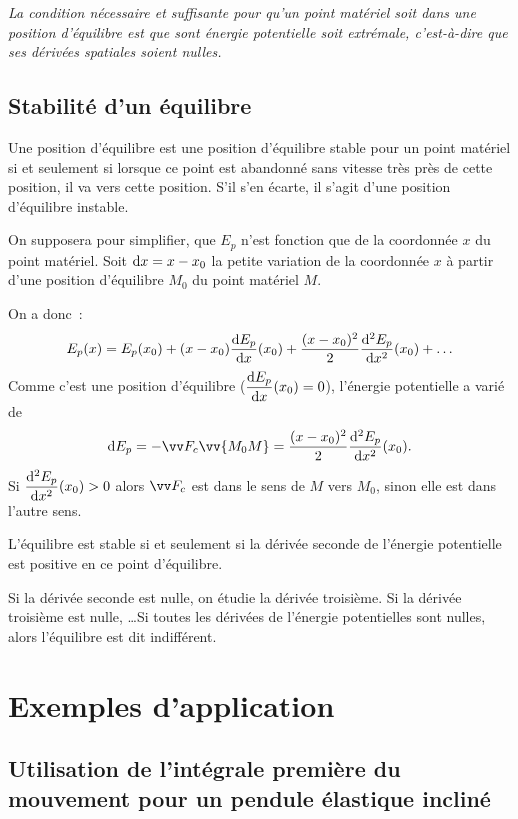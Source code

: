 \emph{La condition nécessaire et suffisante pour qu'un point matériel soit dans une position d'équilibre est que sont énergie potentielle soit extrémale, c'est-à-dire que ses dérivées spatiales soient nulles.}

\subsection{Stabilité d'un équilibre}
\label{chap4-subsec:stabiliteequilibre}

\begin{defdef}
  Une position d'équilibre est une position d'équilibre stable pour un point matériel si et seulement si lorsque ce point est abandonné sans vitesse très près de cette position, il va vers cette position. S'il s'en écarte, il s'agit d'une position d'équilibre instable.
\end{defdef}

On supposera pour simplifier, que $E_p$ n'est fonction que de la coordonnée $x$ du point matériel. Soit $\mathrm{d} x = x-x_0$ la petite variation de la coordonnée $x$ à partir d'une position d'équilibre $M_0$ du point matériel $M$. 

On a donc~:
\begin{equation}
  E_p(x) = E_p(x_0) +(x-x_0)\dfrac{\mathrm{d} E_p}{\mathrm{d} x}(x_0) +\frac{(x-x_0)^2}{2}\dfrac{\mathrm{d}^2 E_p}{\mathrm{d} {x}^2}(x_0) + \ldots
\end{equation}
Comme c'est une position d'équilibre ($\dfrac{\mathrm{d} E_p}{\mathrm{d} x}(x_0)=0$), l'énergie potentielle a varié de
\begin{equation}
  \D E_p = -\vF_c \vv{M_0M} = \frac{(x-x_0)^2}{2}\deriveds{E_p}{x}(x_0).
\end{equation}
Si $\dfrac{\mathrm{d}^2 E_p}{\mathrm{d} {x}^2}(x_0)>0$ alors $\vF_c$ est dans le sens de $M$ vers $M_0$, sinon elle est dans l'autre sens.

L'équilibre est stable si et seulement si la dérivée seconde de l'énergie potentielle est positive en ce point d'équilibre.

Si la dérivée seconde est nulle, on étudie la dérivée troisième. Si la dérivée troisième est nulle, \ldots Si toutes les dérivées de l'énergie potentielles sont nulles, alors l'équilibre est dit indifférent.

\section{Exemples d'application}
\label{chap4-sec:exemplesdapplication}

\subsection{Utilisation de l'intégrale première du mouvement pour un pendule élastique incliné}
\label{chap4-subsec:penduleelastique}

